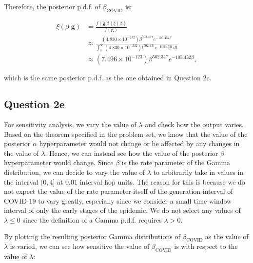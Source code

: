 \documentclass[11pt,fancychapters]{article}
\begin{document}
Therefore, the posterior p.d.f. of $\beta_\text{COVID}$ is:

\begin{equation}\label{eqn2d5}
\begin{split}
    \xi(\beta | \boldsymbol{g}) & = \frac{f(\boldsymbol{g} | \beta) \xi(\beta)}{f(\boldsymbol{g})} \\
    & \approx \frac{(4.830 \times 10^{-232}) \beta^{502.437} e^{-105.452 \beta}}{\int_0^\infty (4.830 \times 10^{-232}) t^{502.437} e^{-105.452 t} \, dt} \\
    & \approx (7.496 \times 10^{-123}) \beta^{502.347} e^{-105.452 \beta},
\end{split}
\end{equation}

which is the same posterior p.d.f. as the one obtained in Question 2c.

\subsection*{Question 2e}

For sensitivity analysis, we vary the value of $\lambda$ and check how the output varies. Based on the theorem specified in the problem set, we know that the value of the posterior $\alpha$ hyperparameter would not change or be affected by any changes in the value of $\lambda$. Hence, we can instead see how the value of the posterior $\beta$ hyperparameter would change. Since $\beta$ is the rate parameter of the Gamma distribution, we can decide to vary the value of $\lambda$ to arbitrarily take in values in the interval $(0, 4]$ at $0.01$ interval hop units. The reason for this is because we do not expect the value of the rate parameter itself of the generation interval of COVID-19 to vary greatly, especially since we consider a small time window interval of only the early stages of the epidemic. We do not select any values of $\lambda \leq 0$ since the definition of a Gamma p.d.f. requires $\lambda > 0$.\newline

By plotting the resulting posterior Gamma distributions of $\beta_\text{COVID}$ as the value of $\lambda$ is varied, we can see how sensitive the value of $\beta_\text{COVID}$ is with respect to the value of $\lambda$:
\end{document}
